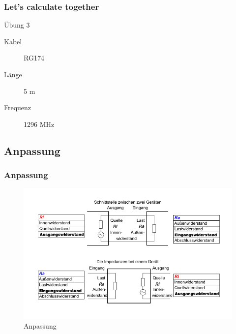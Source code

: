 \begin{frame}
\frametitle{Let's calculate together}
\begin{exampleblock}{Übung 3}
  \begin{description}
 	\item[Kabel] RG174
 	\item[Länge] 5 m
 	\item[Frequenz] 1296 MHz
  \end{description}
\end{exampleblock}
\end{frame}


\subsection*{Anpassung}
\begin{frame}
\frametitle{Anpassung}
\begin{center}
\begin{figure}
\includegraphics[width=1\textwidth,height=.7\textheight,keepaspectratio]{e10/Anpassung.png}
\caption{Anpassung\cite{anpassung}}
\end{figure}
\end{center}
\end{frame}

